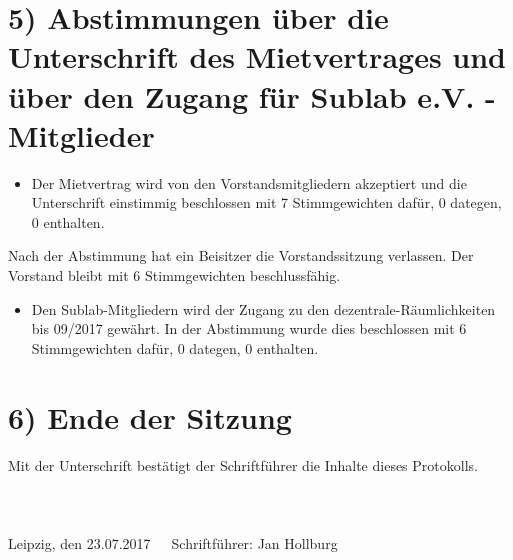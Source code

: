 \documentclass[10pt,a4paper]{scrartcl}
\newcommand{\eventdate}{23.07.2017}
\newcommand{\schriftfuehrer}{Jan Hollburg}
\begin{document}
\section*{5) Abstimmungen {\"u}ber die Unterschrift des Mietvertrages und {\"u}ber den Zugang f{\"u}r Sublab e.V. - Mitglieder}
    \begin{itemize}
        \item Der Mietvertrag wird von den Vorstandsmitgliedern akzeptiert und die Unterschrift einstimmig beschlossen mit 7 Stimmgewichten daf{\"u}r, 0 dategen, 0 enthalten.\\
    \end{itemize}
	Nach der Abstimmung hat ein Beisitzer die Vorstandssitzung verlassen. Der Vorstand bleibt mit 6 Stimmgewichten beschlussf{\"a}hig.
    \begin{itemize}
        \item Den Sublab-Mitgliedern wird der Zugang zu den dezentrale-R{\"a}umlichkeiten bis 09/2017 gew{\"a}hrt.
			In der Abstimmung wurde dies beschlossen mit 6 Stimmgewichten daf{\"u}r, 0 dategen, 0 enthalten.\\
    \end{itemize}

\section*{6) Ende der Sitzung}
    Mit der Unterschrift best{\"a}tigt der Schriftf{\"u}hrer die Inhalte dieses Protokolls.
\\
\\
\\
\\
Leipzig, den \eventdate \ \ \ Schriftf{\"u}hrer: \schriftfuehrer
\end{document}
